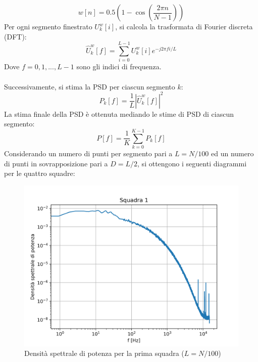 \begin{equation*}
    w[n] = 0.5\left(1-\cos\left( \frac{2\pi n}{N-1} \right)\right)
\end{equation*}
Per ogni segmento finestrato $U_k^w[i]$, si calcola la trasformata di Fourier discreta (DFT):
\begin{equation*}
    \hat U_k^w[f] = \sum_{i=0}^{L-1} U_k^w[i]e^{-j2\pi fi/L}
\end{equation*}
Dove $f=0,1,...,L-1$ sono gli indici di frequenza.\\\\
Successivamente, si stima la PSD per ciascun segmento $k$:
\begin{equation*}
    P_k[f] = \frac 1L \left| \hat U_k^w[f] \right|^2
\end{equation*}
La stima finale della PSD è ottenuta mediando le stime di PSD di ciascun segmento:
\begin{equation*}
    P[f] = \frac 1K \sum_{k=0}^{K-1} P_k[f]
\end{equation*}
Considerando un numero di punti per segmento pari a $L=N/100$ ed un numero di punti in sovrapposizione pari a $D=L/2$, si ottengono i seguenti diagrammi per le quattro squadre:
\begin{figure}[H]
    \centering
    \includegraphics[width=.85\textwidth]{images/9/sq1timeserieswelchcl.png}
    \caption{Densità spettrale di potenza per la prima squadra ($L=N/100$)}
\end{figure}

